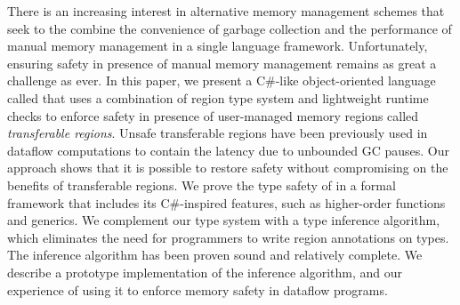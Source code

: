 There is an increasing interest in alternative memory management
schemes that seek to the combine the convenience of garbage collection
and the performance of manual memory management in a single language
framework.  Unfortunately, ensuring safety in presence of manual
memory management remains as great a challenge as ever. In this paper,
we present a C\#-like object-oriented language called \name that uses
a combination of region type system and lightweight runtime checks to
enforce safety in presence of user-managed memory regions called
\emph{transferable regions}. Unsafe transferable regions have been
previously used in dataflow computations to contain the latency due to
unbounded GC pauses. Our approach shows that it is possible to restore
safety without compromising on the benefits of transferable regions.
We prove the type safety of \name in a formal framework that includes
its C\#-inspired features, such as higher-order functions and
generics. We complement our type system with a type inference
algorithm, which eliminates the need for programmers to write region
annotations on types. The inference algorithm has been proven sound
and relatively complete. We describe a prototype implementation of the
inference algorithm, and our experience of using it to enforce memory
safety in dataflow programs.

